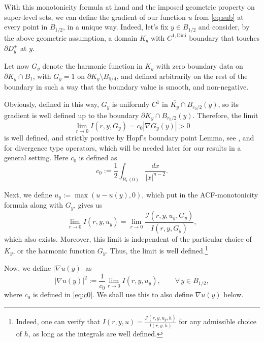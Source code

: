 \documentclass[11pt,reqno]{amsart}
\theoremstyle{plain}
\theoremstyle{remark}
\numberwithin{equation}{section}
\begin{document}
With this monotonicity formula at hand and the imposed geometric property on  super-level sets, 
we can define the gradient of our function $u$ from \eqref{eq:sub} at every point in $B_{1/2}$, in a unique way.
 Indeed, let's fix $y\in B_{1/2}$ and consider, by the above geometric assumption, a domain 
  $K_y $ with $C^{1,\text{Dini}}$ boundary that touches $\partial D_y^+$ at $y$.

Let now $G_y$ denote the harmonic function in $K_y$ with zero boundary data on $\partial K_y \cap B_{1}$, with $G_y = 1$ on $\partial K_y \setminus B_{5/4}$, and defined arbitrarily on the rest of the boundary in such a way that the boundary value is smooth, and non-negative.


Obviously, defined in this way,  $G_{y}$ is uniformly $C^1$ in $\overline{K_y} \cap B_{r_0/2} (y)$, so its gradient is well defined up to the boundary $\partial K_y \cap B_{r_0/2} (y)$. Therefore, the limit  
\[
\lim_{r \to 0} I(r, y, G_{y}) = c_0|\nabla G_y(y)| >0 
\]  
is well defined, and strictly positive by Hopf's boundary point Lemma, see \cite{Widman}, and \cite{Ap-Naz} for divergence type operators, which will be needed later for our results in a general setting.
Here  $c_0$ is defined as 
\begin{equation}\label{eq:c0}
c_0 :=
 \frac12 \int_{B_1 (0)   } \frac{dx }{|x |^{n-2}} .
\end{equation}
 
Next, we define $u_y := \max(u - u(y), 0)$, which put in the   ACF-monotonicity formula along with $G_y$, 
gives us 
\begin{equation}\label{eq:I}
\lim_{r \to 0} I(r, y, u_y) = \lim_{r \to 0} \frac{\mathcal{I}(r, y, u_y, G_y )}{I(r, y, G_y )},
\end{equation}
which also exists.
Moreover, this limit is independent of the particular choice of $K_y$, or the harmonic function $G_y$.
Thus, the limit is well defined.\footnote{Indeed, one can verify that $I(r, y, u) = \frac{\mathcal{I}(r, y, u_y, h)}{I(r, y, h)}$ for any admissible choice of $h$, as long as the integrals are well defined.} 




Now,  we define $|\nabla u (y)| $  
as 
\begin{equation}\label{eq:gradient}
    |\nabla u(y)|^2 := \frac{1}{c_0} \lim_{r \to 0} I(r, y, u_y), \qquad \forall\, y \in   B_{1/2},
\end{equation}
where $c_0$ is defined in \eqref{eq:c0}. We shall use this  to also define $\nabla u (y) $ below.
\end{document}
